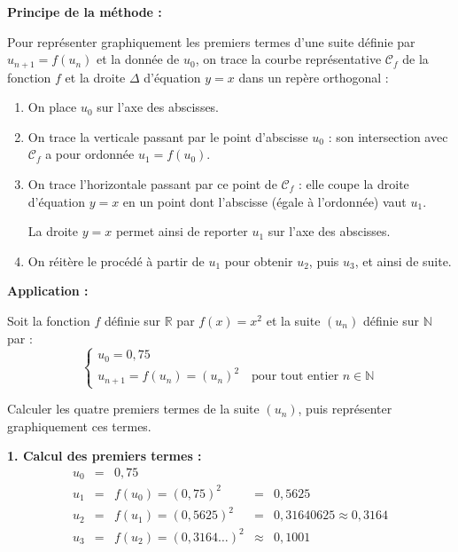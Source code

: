 \begin{methode}
	\textbf{Principe de la méthode :}

	Pour représenter graphiquement les premiers termes d'une suite définie par $u_{n+1} = f(u_n)$ et la donnée de $u_0$, on trace la courbe représentative $\mathscr{C}_f$ de la fonction $f$ et la droite $\Delta$ d'équation $y = x$ dans un repère orthogonal :
	\begin{enumerate}
		\item On place $u_0$ sur l'axe des abscisses.
		\item On trace la verticale passant par le point d'abscisse $u_0$ : son intersection avec $\mathscr{C}_f$ a pour ordonnée $u_1 = f(u_0)$.
		\item On trace l'horizontale passant par ce point de $\mathscr{C}_f$ : elle coupe la droite d'équation $y = x$ en un point dont l'abscisse (égale à l'ordonnée) vaut $u_1$.

		      La droite $y = x$ permet ainsi de \og reporter \fg{} $u_1$ sur l'axe des abscisses.
		\item On réitère le procédé à partir de $u_1$ pour obtenir $u_2$, puis $u_3$, et ainsi de suite.
	\end{enumerate}

	\medskip
	\textbf{Application :}

	Soit la fonction $f$ définie sur $\mathbb{R}$ par $f(x) = x^2$ et la suite $(u_n)$ définie sur $\mathbb{N}$ par :
	\[
		\begin{cases}
			u_0 = 0{,}75 \\
			u_{n+1} = f(u_n) = (u_n)^2\quad \text{pour tout entier } n \in \mathbb{N}
		\end{cases}
	\]

	Calculer les quatre premiers termes de la suite $(u_n)$, puis représenter graphiquement ces termes.

	\begin{correction}
		\textbf{1. Calcul des premiers termes :}
		\[
			\begin{array}{rclcl}
				u_0 & = & 0{,}75                     &         &                               \\
				u_1 & = & f(u_0) = (0{,}75)^2        & =       & 0{,}5625                      \\
				u_2 & = & f(u_1) = (0{,}5625)^2      & =       & 0{,}31640625 \approx 0{,}3164 \\
				u_3 & = & f(u_2) = (0{,}3164\dots)^2 & \approx & 0{,}1001
			\end{array}
		\]


\end{correction}
\end{methode}
